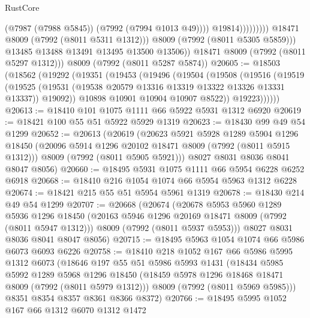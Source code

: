 \begin{lexlean}{RustCore}
\begin{coremodule}
                                    (@7987 (@7988 @5845))
                                    (@7992 (@7994 @1013 @49))))
                                @19814)))))))))
              @18471
              @8009
              (@7992 (@8011 @5311 @1312)))
            @8009
            (@7992 (@8011 @5305 @5859)))
          @13485
          @13488
          @13491
          @13495
          @13500
          @13506))
      @18471
      @8009
      (@7992 (@8011 @5297 @1312)))
    @8009
    (@7992 (@8011 @5287 @5874))
@20605 := @18503
    (@18562
      (@19292
        (@19351
          (@19453
            (@19496
              (@19504
                (@19508
                  (@19516
                    (@19519
                      (@19525
                        (@19531 (@19538 @20579 @13316 @13319 @13322 @13326 @13331 @13337))
                        @19092))
                    @10898
                    @10901
                    @10904
                    @10907
                    @8522))
                @19223))))))
@20613 := @18410 @101 @1075 @1111 @66 @5922 @5931 @1312 @6920
@20619 := @18421 @100 @55 @51 @5922 @5929 @1319
@20623 := @18430 @99 @49 @54 @1299
@20652 := @20613
    (@20619
      (@20623
        @5921
        @5928
        @1289
        @5904
        @1296
        @18450
        (@20096 @5914 @1296 @20102 @18471 @8009 (@7992 (@8011 @5915 @1312)))
        @8009
        (@7992 (@8011 @5905 @5921)))
      @8027
      @8031
      @8036
      @8041
      @8047
      @8056)
@20660 := @18495 @5931 @1075 @1111 @66 @5954 @6228 @6252 @6918
@20668 := @18410 @216 @1054 @1074 @66 @5954 @5963 @1312 @6228
@20674 := @18421 @215 @55 @51 @5954 @5961 @1319
@20678 := @18430 @214 @49 @54 @1299
@20707 := @20668
    (@20674
      (@20678
        @5953
        @5960
        @1289
        @5936
        @1296
        @18450
        (@20163 @5946 @1296 @20169 @18471 @8009 (@7992 (@8011 @5947 @1312)))
        @8009
        (@7992 (@8011 @5937 @5953)))
      @8027
      @8031
      @8036
      @8041
      @8047
      @8056)
@20715 := @18495 @5963 @1054 @1074 @66 @5986 @6073 @6093 @6226
@20758 := @18410
    @218
    @1052
    @167
    @66
    @5986
    @5995
    @1312
    @6073
    (@18646
      @197
      @55
      @51
      @5986
      @5993
      @1431
      (@18434
        @5985
        @5992
        @1289
        @5968
        @1296
        @18450
        (@18459 @5978 @1296 @18468 @18471 @8009 (@7992 (@8011 @5979 @1312)))
        @8009
        (@7992 (@8011 @5969 @5985)))
      @8351
      @8354
      @8357
      @8361
      @8366
      @8372)
@20766 := @18495 @5995 @1052 @167 @66 @1312 @6070 @1312 @1472

\end{coremodule}
\end{lexlean}
